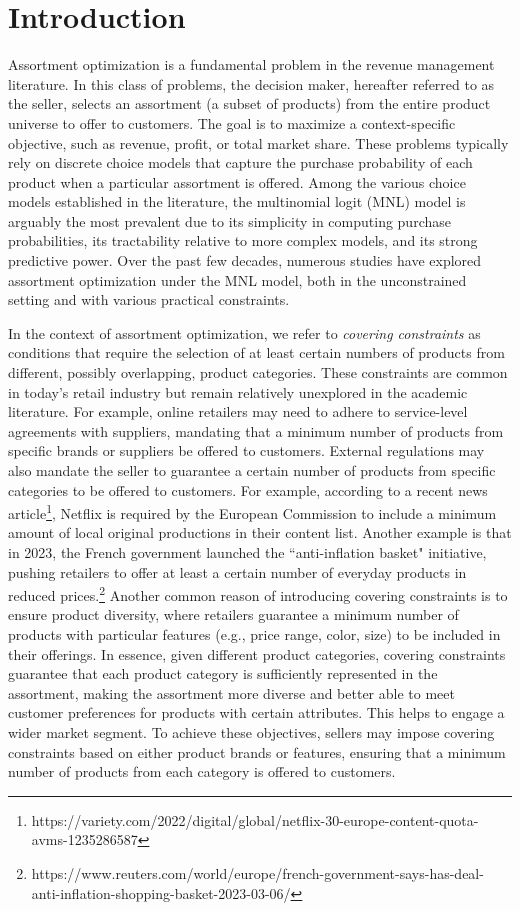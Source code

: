 \documentclass[msom,non-blindrev]{informs3} %
\theoremstyle{definition}
\begin{document}
\section{Introduction}

Assortment optimization is a fundamental problem in the revenue management literature. In this class of problems, the decision maker, hereafter referred to as the seller, selects an assortment (a subset of products) from the entire product universe to offer to customers. The goal is to maximize a context-specific objective, such as revenue, profit, or total market share. These problems typically rely on discrete choice models that capture the purchase probability of each product when a particular assortment is offered. Among the various choice models established in the literature, the multinomial logit (MNL) model is arguably the most prevalent due to its simplicity in computing purchase probabilities, its tractability relative to more complex models, and its strong predictive power. Over the past few decades, numerous studies have explored assortment optimization under the MNL model, both in the unconstrained setting and with various practical constraints.


In the context of assortment optimization, we refer to {\em covering constraints} as conditions that require the selection of at least  certain numbers of products from different, possibly overlapping, product categories. These constraints are common in today’s retail industry but remain relatively unexplored in the academic literature. For example, online retailers may need to adhere to service-level agreements with suppliers, mandating that a minimum number of products from specific brands or suppliers be offered to customers. {External regulations may also mandate the seller to guarantee a certain number of products from specific categories to be offered to customers. For example, according to a recent news article\footnote{https://variety.com/2022/digital/global/netflix-30-europe-content-quota-avms-1235286587}, Netflix is required by the European Commission to include a minimum amount of local original productions in their content list. Another example is that in 2023, the French government launched the ``anti-inflation basket" initiative, pushing retailers to offer at least a certain number of everyday products in reduced prices.\footnote{https://www.reuters.com/world/europe/french-government-says-has-deal-anti-inflation-shopping-basket-2023-03-06/} Another common reason of introducing covering constraints is to ensure product diversity, where retailers guarantee a minimum number of products with particular features (e.g., price range, color, size) to be included in their offerings.} In essence, given different product categories, covering constraints guarantee that each product category is sufficiently represented in the assortment, making the assortment more diverse and better able to meet customer preferences for products with certain attributes. This helps to engage a wider market segment. To achieve these objectives, sellers may impose covering constraints based on either product brands or features, ensuring that a minimum number of products from each category is {offered} to customers.
\end{document}
